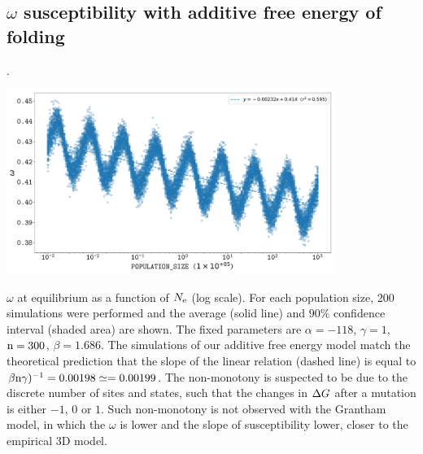 \documentclass{article}
\renewcommand*{\bm}[1]{#1}%
\begin{document}
\subsection{$\bm{\omega}$ susceptibility with additive free energy of folding}.
\begin{center}
 \includegraphics[width=0.8\textwidth] {artworks/SimuStab-Elasticity.pdf}
\end{center}
$\omega$ at equilibrium as a function of $\bm{\Ne}$ (log scale).
For each population size, $200$ simulations were performed and the average (solid line) and $90\%$ confidence interval (shaded area) are shown.
The fixed parameters are $\alpha=-118$, $\gamma=1$, $\text{n}=300$, $\beta=1.686$.
The simulations of our additive free energy model match the theoretical prediction that the slope of the linear relation (dashed line) is equal to $\beta \text{n} \gamma)^{-1} = 0.00198 \simeq = 0.00199$.
The non-monotony is suspected to be due to the discrete number of sites and states, such that the changes in $\Delta G$ after a mutation is either $-1$, $0$ or $1$. Such non-monotony is not observed with the Grantham model, in which the $\omega$ is lower and the slope of susceptibility lower, closer to the empirical 3D model. 

\end{document}
